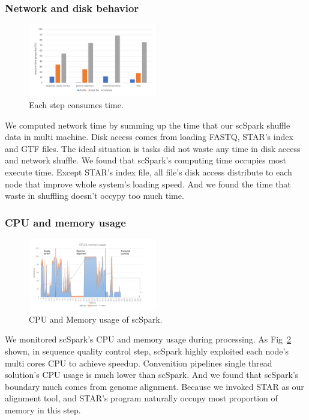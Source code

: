 \documentclass[conference]{IEEEtran}
\begin{document}
\subsubsection{Network and disk behavior}
\begin{figure}
  \includegraphics[width=0.5\textwidth]{fig7.pdf}
  \caption{Each step consumes time.} \label{fig7}
\end{figure}
We computed network time by summing up the time that our scSpark shuffle data in multi machine. 
Disk access comes from loading FASTQ, STAR's index and GTF files. 
The ideal situation is tasks did not waste any time in disk access and network shuffle. 
We found that scSpark's computing time occupies most execute time. 
Except STAR's index file, all file's disk access distribute to each node that improve whole system's loading speed. 
And we found the time that waste in shuffling doesn't occypy too much time. 
  
\subsubsection{CPU and memory usage}
\begin{figure}
  \includegraphics[width=0.5\textwidth]{fig8.pdf}
  \caption{CPU and Memory usage of scSpark.} \label{fig8}
\end{figure}
We monitored scSpark's CPU and memory usage during processing. 
As Fig~\ref{fig8} shown, in sequence quality control step, scSpark highly exploited each node's multi cores CPU to achieve speedup. 
Convenition pipelines single thread solution's CPU usage is much lower than scSpark. 
And we found that scSpark's boundary much comes from genome alignment.
Because we invoked STAR as our alignment tool, and STAR's program naturally occupy most proportion of memory in this step.
  
\end{document}
